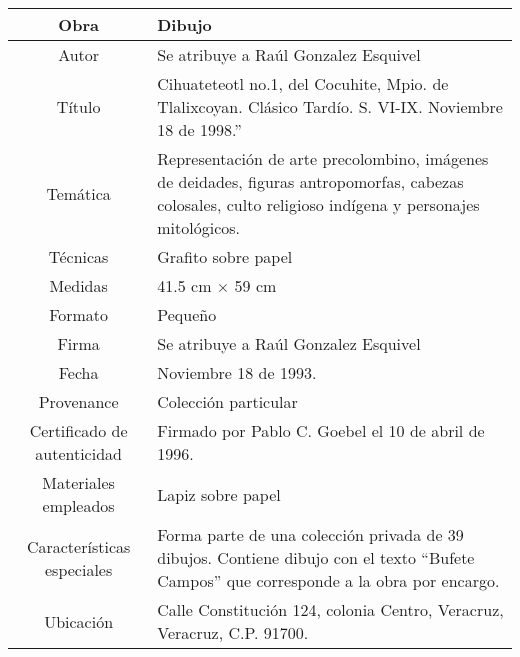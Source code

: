 \begin{table}[H]
\centering
\begin{tabular}{|c|m{}|}
\hline
Obra& Dibujo	\\
\hline
Autor & Se atribuye a Ra\'ul Gonzalez Esquivel\\
\hline
T\'itulo & Cihuateteotl no.1, del Cocuhite, Mpio. de Tlalixcoyan. Cl\'asico Tard\'io. S. VI-IX. Noviembre 18 de 1998.''\\
\hline
Tem\'atica & Representaci\'on de arte precolombino, im\'agenes de deidades, figuras antropomorfas, cabezas colosales, culto religioso ind\'igena y personajes mitol\'ogicos.\\
\hline
T\'ecnicas &Grafito sobre papel \\
\hline
Medidas & 41.5 cm $\times$ 59 cm \\
\hline
 Formato & Peque\~no \\
 \hline
 Firma & Se atribuye a Ra\'ul Gonzalez Esquivel\\ 
 \hline
  Fecha & Noviembre 18 de 1993.\\
 \hline
 Provenance & Colecci\'on particular\\
 \hline
 Certificado de autenticidad& Firmado por Pablo C. Goebel el 10 de abril de 1996.  \\
 \hline 
  Materiales empleados & Lapiz sobre papel\\
 \hline
 Caracter\'isticas especiales & Forma parte de una colecci\'on privada de 39 dibujos. 
Contiene dibujo con el texto ``Bufete Campos'' que corresponde a la obra por encargo. \\
\hline 
Ubicaci\'on & Calle Constituci\'on 124, colonia Centro, Veracruz, Veracruz, C.P. 91700.\\
\hline

\end{tabular}
\end{table}

